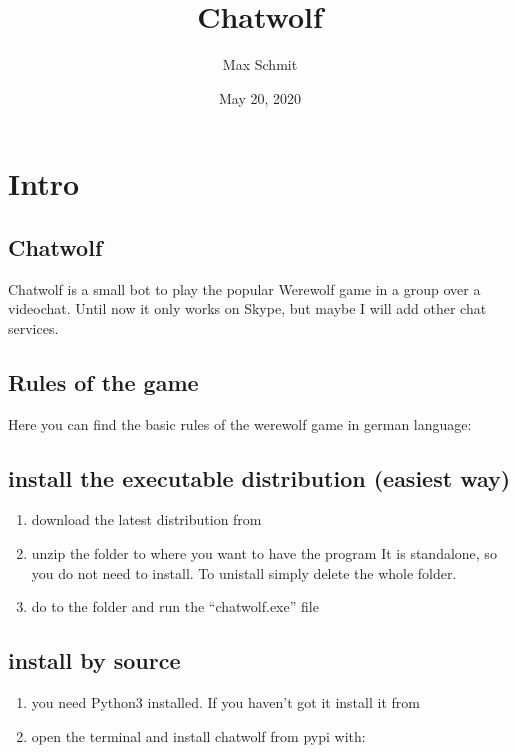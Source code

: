 \documentclass[letterpaper,10pt,english]{sphinxmanual}
\title{Chatwolf}
\date{May 20, 2020}
\author{Max Schmit}
\begin{document}
\pagestyle{empty}
\sphinxmaketitle
\pagestyle{plain}
\sphinxtableofcontents
\pagestyle{normal}
\label{\detokenize{index::doc}}



\chapter{Intro}
\label{\detokenize{intro:intro}}\label{\detokenize{intro::doc}}

\section{Chatwolf}
\label{\detokenize{data/Readme:chatwolf}}\label{\detokenize{data/Readme::doc}}
Chatwolf is a small bot to play the popular Werewolf game in a group over a videochat.
Until now it only works on Skype, but maybe I will add other chat services.


\section{Rules of the game}
\label{\detokenize{data/Readme:rules-of-the-game}}
Here you can find the basic rules of the werewolf game in german language:


\section{install the executable distribution (easiest way)}
\label{\detokenize{data/Readme:install-the-executable-distribution-easiest-way}}\begin{enumerate}
%
\item {} 
download the latest distribution from 

\item {} 
unzip the folder to where you want to have the program
It is standalone, so you do not need to install. To unistall simply delete the whole folder.

\item {} 
do to the folder and run the “chatwolf.exe” file

\end{enumerate}


\section{install by source}
\label{\detokenize{data/Readme:install-by-source}}\begin{enumerate}
%
\item {} 
you need Python3 installed.
If you haven’t got it install it from 

\item {} 
open the terminal and install chatwolf from pypi with:

\end{enumerate}
\end{document}
